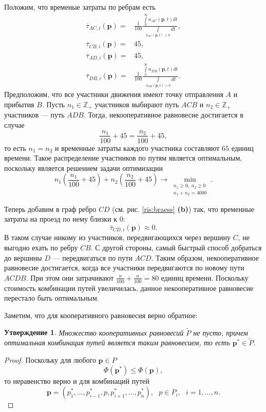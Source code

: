 \documentclass[12pt, a4paper]{article}
\newtheorem{state}{Утверждение}[section]
\begin{document}
Положим, что временые затраты по ребрам есть 
\begin{align*}
	\overline{\tau}_{AC, i} (\textbf{p}) = &\frac{1}{100}\frac{\int\limits_{0}^{\infty}n_{AC} (\textbf{p}, t)dt}{\int\limits_{n_{AC} (\textbf{p}, t) > 0}dt}, 
	\\
     \overline{\tau}_{CB, i} (\textbf{p}) = &45,
	\\
	\overline{\tau}_{AD, i} (\textbf{p}) = &45, 
	\\ 
	\overline{\tau}_{DB, i} (\textbf{p}) = &\frac{1}{100}\frac{\int\limits_{0}^{\infty}n_{DB} (\textbf{p}, t)dt}{\int\limits_{n_{DB} (\textbf{p}, t) > 0}dt}.
\end{align*}
Предположим, что все участники движения имеют точку отправления $A$ и прибытия $B$. Пусть $n_1 \in \mathbb{Z}_+$ участников выбирают путь $ACB$ и $n_2  \in \mathbb{Z}_+$ участников --- путь $ADB$. Тогда, некооперативное равновесие достигается в случае
$$\frac{n_1}{100} + 45 = \frac{n_2}{100} + 45,$$
то есть $n_1 = n_2$ и временные затраты каждого участника составляют $65$ единиц времени. Такое распределение участников по путям является оптимальным, поскольку является решением задачи оптимизации
$$n_1\left(\frac{n_1}{100} + 45\right) + n_2\left(\frac{n_2}{100} + 45\right) \rightarrow \min\limits_{\substack{n_1 \ge 0, \: n_2 \ge 0 \\ n_1 + n_2 = 4000}}.$$

Теперь добавим в граф ребро $CD$ (см. рис. \ref{ris:braess} \textbf{(b)}) так, что временные затраты на проезд по нему близки к 0:
$$\overline{\tau}_{CD, i} (\textbf{p}) \approx 0.$$
В таком случае никому из участников, передвигающихся через вершину $C$, не выгодно ехать по ребру $CB$. С другой стороны, самый быстрый способ добраться до вершины $D$ --- передвигаться по пути $ACD$. Таким образом, некооперативное равновесие достигается, когда все участники передвигаются по новому пути $ACDB$. При этом они затрачивают $\frac{n}{100} + \frac{n}{100} = 80$ единиц времени. Поскольку стоимость комбинации путей увеличилась, данное некооперативное равновесие перестало быть оптимальным.

Заметим, что для кооперативного равновесия верно обратное:

\begin{state}
Множество кооперативных равновесий $\widetilde{P}$ не пусто, причем
оптимальная комбинация путей является таким равновесием, то есть $\textbf{p}^* \in \widetilde{P}$.
\end{state}

\begin{proof}
	Поскольку для любого $\textbf{p} \in P$ 
	$$\Phi (\textbf{p}^*) \le \Phi (\textbf{p}),$$
	то неравенство верно и для комбинаций путей $$\textbf{p} = \left(p^*_1, \ldots, p^*_{i - 1}, p, p^*_{i + 1}, \ldots, p^*_{n} \right), \text{ } p \in P_i, \text{ } i = 1, \ldots, n.$$
\end{proof}
\end{document}
